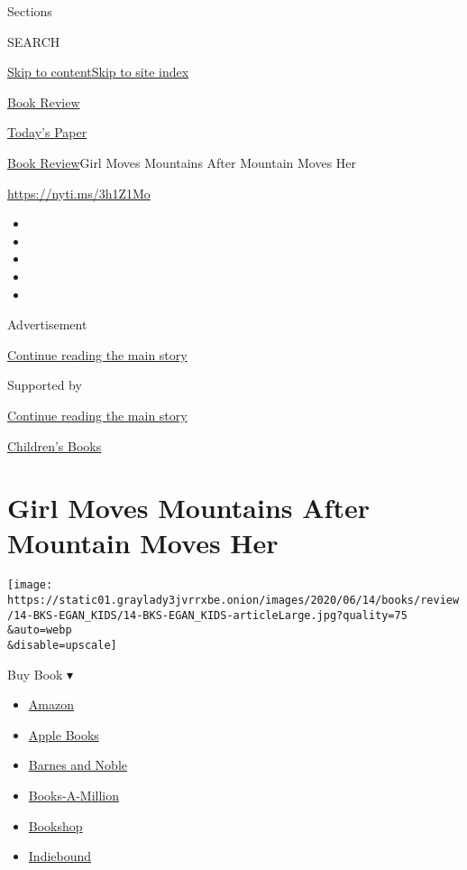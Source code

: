 Sections

SEARCH

\protect\hyperlink{site-content}{Skip to
content}\protect\hyperlink{site-index}{Skip to site index}

\href{https://www.nytimes3xbfgragh.onion/section/books/review}{Book
Review}

\href{https://myaccount.nytimes3xbfgragh.onion/auth/login?response_type=cookie\&client_id=vi}{}

\href{https://www.nytimes3xbfgragh.onion/section/todayspaper}{Today's
Paper}

\href{/section/books/review}{Book Review}\textbar{}Girl Moves Mountains
After Mountain Moves Her

\url{https://nyti.ms/3h1Z1Mo}

\begin{itemize}
\item
\item
\item
\item
\item
\end{itemize}

Advertisement

\protect\hyperlink{after-top}{Continue reading the main story}

Supported by

\protect\hyperlink{after-sponsor}{Continue reading the main story}

\href{/column/childrens-books}{Children's Books}

\hypertarget{girl-moves-mountains-after-mountain-moves-her}{%
\section{Girl Moves Mountains After Mountain Moves
Her}\label{girl-moves-mountains-after-mountain-moves-her}}

\texttt{[image: https://static01.graylady3jvrrxbe.onion/images/2020/06/14/books/review/14-BKS-EGAN\_KIDS/14-BKS-EGAN\_KIDS-articleLarge.jpg?quality=75\\\&auto=webp\\\&disable=upscale]}

Buy Book ▾

\begin{itemize}
\tightlist
\item
  \href{https://www.amazon.com/gp/search?index=books\&tag=NYTBSREV-20\&field-keywords=Echo+Mountain+Lauren+Wolk}{Amazon}
\item
  \href{https://du-gae-books-dot-nyt-du-prd.appspot.com/buy?title=Echo+Mountain\&author=Lauren+Wolk}{Apple
  Books}
\item
  \href{https://www.anrdoezrs.net/click-7990613-11819508?url=https\%3A\%2F\%2Fwww.barnesandnoble.com\%2Fw\%2F\%3Fean\%3D9780525555568}{Barnes
  and Noble}
\item
  \href{https://www.anrdoezrs.net/click-7990613-35140?url=https\%3A\%2F\%2Fwww.booksamillion.com\%2Fp\%2FEcho\%2BMountain\%2FLauren\%2BWolk\%2F9780525555568}{Books-A-Million}
\item
  \href{https://bookshop.org/a/3546/9780525555568}{Bookshop}
\item
  \href{https://www.indiebound.org/book/9780525555568?aff=NYT}{Indiebound}
\end{itemize}

